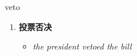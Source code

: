 
\begin{frame}
{\huge veto}
\begin{center}
\begin{enumerate}\Large
  \item \textbf{投票否决}
  \begin{itemize}
    \item \em{\Large{the president vetoed the bill}}
  \end{itemize}
\end{enumerate}
\end{center}
\end{frame}
